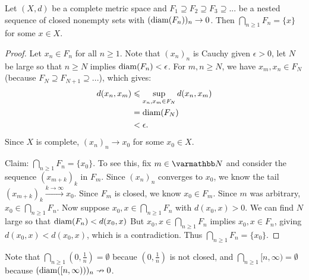     \begin{proposition}\label{prop:cantor-intersection-thm}
        Let $(X,d)$ be a complete metric space and $F_1 \supseteq F_2 \supseteq F_3 \supseteq ...$ be a nested sequence of closed nonempty sets with $(\operatorname{diam}(F_n))_n \rightarrow 0$. Then $\bigcap_{n \geq 1}F_n = \{x\}$ for some $x \in X$.
    \end{proposition}
        \begin{proof}
            Let $x_n \in F_n$ for all $n \geq 1$. Note that $(x_n)_n$ is Cauchy \textemdash given $\epsilon > 0$, let $N$ be large so that $n \geq N$ implies $\operatorname{diam}(F_n) < \epsilon$. For $m,n \geq N$, we have $x_m,x_n \in F_N$ (because $F_N \supseteq F_{N+1} \supseteq ...$), which gives:
                \begin{equation*}
                \begin{split}
                    d(x_n,x_m)
                    & \leqslant \sup_{x_n,x_m \in F_N} d(x_n,x_m) \\
                    & = \operatorname{diam}(F_N) \\
                    & < \epsilon.
                \end{split}
                \end{equation*}
            Since $X$ is complete, $(x_n)_n \rightarrow x_0$ for some $x_0 \in X$. 

            Claim: $\bigcap_{n \geq 1}F_n = \{x_0\}$. To see this, fix $m \in \bfN$ and consider the sequence $(x_{m+k})_k$ in $F_m$. Since $(x_n)_n$ converges to $x_0$, we know the tail $(x_{m+k})_k \xrightarrow{k \rightarrow \infty} x_0$. Since $F_m$ is closed, we know $x_0 \in F_m$. Since $m$ was arbitrary, $x_0 \in \bigcap_{n \geq 1}F_n$. Now suppose $x_0,x \in \bigcap_{n \geq 1}F_n$ with $d(x_0,x) > 0$. We can find $N$ large so that $\operatorname{diam}(F_n) < d(x_0,x)$ But $x_0,x \in \bigcap_{n \geq 1}F_n$ implies $x_0,x \in F_n$, giving $d(x_0,x) < d(x_0,x)$, which is a contradiction. Thus $\bigcap_{n \geq 1}F_n = \{x_0\}$.
        \end{proof}

    \begin{example}
        Note that $\bigcap_{n \geq 1}(0,\frac{1}{n}) = \emptyset$ becaue $(0,\frac{1}{n})$ is not closed, and $\bigcap_{n \geq 1}[n,\infty) = \emptyset$ because $(\operatorname{diam}([n,\infty)))_n \nrightarrow 0$. 
    \end{example}

